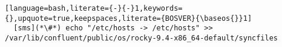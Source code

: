 \begin{lstlisting}[language=bash,literate={-}{-}1,keywords={},upquote=true,keepspaces,literate={BOSVER}{\baseos{}}1]
  [sms](*\#*) echo "/etc/hosts -> /etc/hosts" >> /var/lib/confluent/public/os/rocky-9.4-x86_64-default/syncfiles

\end{lstlisting}
  


